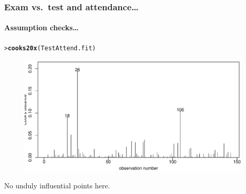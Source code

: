 \documentclass{beamer}\usepackage[]{graphicx}\usepackage[]{xcolor}
\makeatletter
\newcommand{\hlstd}[1]{\textcolor[rgb]{0.345,0.345,0.345}{#1}}%
\newcommand{\hlkwd}[1]{\textcolor[rgb]{0.737,0.353,0.396}{\textbf{#1}}}%
\newenvironment{kframe}{%
 \def\at@end@of@kframe{}%
 \ifinner\ifhmode%
  \def\at@end@of@kframe{\end{minipage}}%
  \begin{minipage}{\columnwidth}%
 \fi\fi%
 \def\FrameCommand##1{\hskip\@totalleftmargin \hskip-\fboxsep
 \colorbox{shadecolor}{##1}\hskip-\fboxsep
     \hskip-\linewidth \hskip-\@totalleftmargin \hskip\columnwidth}%
 \MakeFramed {\advance\hsize-\width
   \@totalleftmargin\z@ \linewidth\hsize
   \@setminipage}}%
 {\par\unskip\endMakeFramed%
 \at@end@of@kframe}
\newenvironment{knitrout}{}{} %
\makeatother
\begin{document}
\begin{frame}[fragile]
\frametitle{Exam vs.\ test \textbf{and} attendance\ldots}
\framesubtitle{Assumption checks\ldots}

\begin{knitrout}\scriptsize
{}\color{fgcolor}\begin{kframe}
\begin{alltt}
\hlstd{> }\hlkwd{cooks20x}\hlstd{(TestAttend.fit)}
\end{alltt}
\end{kframe}
\end{knitrout}



\begin{figure}
  \centering
  \includegraphics[scale=0.5]{figure/RC-H08-016}
\end{figure}

No unduly influential points here.
\end{frame}
\end{document}

